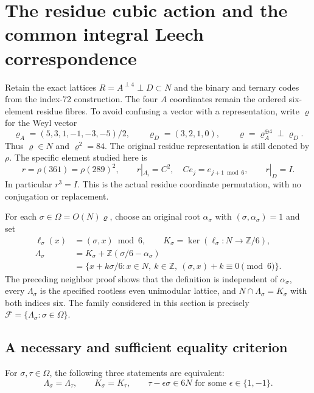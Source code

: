 \section{The residue cubic action and the common integral Leech correspondence}
\label{esrf:sec:fixed-neighbor}

Retain the exact lattices $R=A^{\perp4}\perp D\subset N$ and the
binary and ternary codes from the index-72 construction.
The four $A$ coordinates remain the ordered six-element residue
fibres. To avoid confusing a vector with a representation, write
$\varrho$ for the Weyl vector
\[
 \varrho_A=(5,3,1,-1,-3,-5)/2,\qquad
 \varrho_D=(3,2,1,0),\qquad
 \varrho=\varrho_A^{\oplus4}\perp\varrho_D.
\]
Thus $\varrho\in N$ and $\varrho^2=84$.
The original residue representation is still denoted by $\rho$.
The specific element studied here is
\[
 r=\rho(361)=\rho(289)^2,\qquad
 r|_{A_i}=C^2,\quad Ce_j=e_{j+1\bmod6},\qquad r|_D=I.
 \tag{RF1}
\]
In particular $r^3=I$. This is the actual residue coordinate
permutation, with no conjugation or replacement.

For each $\sigma\in\Omega=O(N)\varrho$, choose an original root
$\alpha_\sigma$ with $(\sigma,\alpha_\sigma)=1$ and set
\[
 \begin{split}
 \ell_\sigma(x)&=(\sigma,x)\bmod6,\qquad
 K_\sigma=\ker(\ell_\sigma:N\to\mathbb Z/6),\\
 \Lambda_\sigma&=K_\sigma+
                      \mathbb Z(\sigma/6-\alpha_\sigma)\\
 &=\{x+k\sigma/6:x\in N,\ k\in\mathbb Z,\
                                    (\sigma,x)+k\equiv0\pmod6\}.
 \end{split}
 \tag{RF2}
\]
The preceding neighbor proof shows that the definition is independent
of $\alpha_\sigma$, every $\Lambda_\sigma$ is the specified rootless
even unimodular lattice, and
$N\cap\Lambda_\sigma=K_\sigma$ with both indices six.
The family considered in this section is precisely
$\mathscr F=\{\Lambda_\sigma:\sigma\in\Omega\}$.

\subsection{A necessary and sufficient equality criterion}

\begin{theorem}
\label{esrf:thm:equality}
For $\sigma,\tau\in\Omega$, the following three statements are equivalent:
\[
 \Lambda_\sigma=\Lambda_\tau,\qquad
 K_\sigma=K_\tau,\qquad
 \tau-\epsilon\sigma\in6N
                 \text{ for some }\epsilon\in\{1,-1\}.
 \tag{RF3}
\]
\end{theorem}

